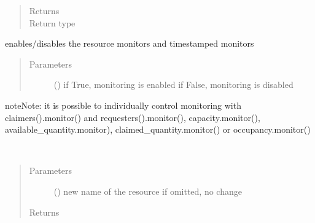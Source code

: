 \documentclass[letterpaper,10pt,english]{sphinxmanual}
\begin{document}
\begin{fulllineitems}
\begin{fulllineitems}
\begin{quote}
\begin{description}
\item[{Returns}] \leavevmode
{}

\item[{Return type}] \leavevmode
{\hyperref[\detokenize{Reference:salabim.Resource}]{}}

\end{description}\end{quote}

\end{fulllineitems}


\begin{fulllineitems}
\label{\detokenize{Reference:salabim.Resource.monitor}}
enables/disables the resource monitors  and timestamped monitors
\begin{quote}\begin{description}
\item[{Parameters}] \leavevmode
{} () \textendash{} if True, monitoring is enabled 
if False, monitoring is disabled 

\end{description}\end{quote}

\begin{sphinxadmonition}{note}{Note:}
it is possible to individually control monitoring with claimers().monitor()
and requesters().monitor(), capacity.monitor(), available\_quantity.monitor),
claimed\_quantity.monitor() or occupancy.monitor()
\end{sphinxadmonition}

\end{fulllineitems}


\begin{fulllineitems}
\label{\detokenize{Reference:salabim.Resource.name}}~\begin{quote}\begin{description}
\item[{Parameters}] \leavevmode
{} () \textendash{} new name of the resource
if omitted, no change

\item[{Returns}] \leavevmode
{}


\end{description}
\end{quote}
\end{fulllineitems}
\end{fulllineitems}
\end{document}
